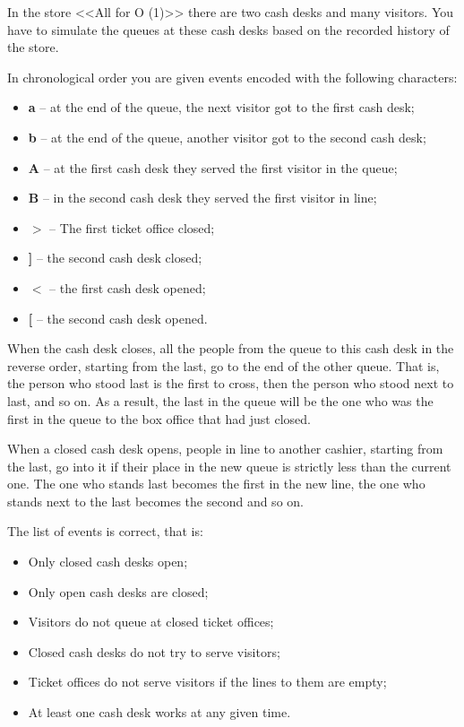 \documentclass[a4paper]{article}
\begin{document}
In the store <<All for O (1)>> there are two cash desks and many visitors. You have to simulate the queues at these cash desks based on the recorded history of the store.

In chronological order you are given events encoded with the following characters:
\begin{itemize}
\item \textbf{a} -- at the end of the queue, the next visitor got to the first cash desk;
\item \textbf{b} -- at the end of the queue, another visitor got to the second cash desk;
\item\textbf{A} -- at the first cash desk they served the first visitor in the queue;
\item \textbf{B} -- in the second cash desk they served the first visitor in line;
\item $\boldsymbol{>}$ -- The first ticket office closed;
\item \textbf{]} -- the second cash desk closed;
\item $\boldsymbol{<}$ -- the first cash desk opened;
\item \textbf{[} -- the second cash desk opened.
\end{itemize}

When the cash desk closes, all the people from the queue to this cash desk in the reverse order, starting from the last, go to the end of the other queue. That is, the person who stood last is the first to cross, then the person who stood next to last, and so on. As a result, the last in the queue will be the one who was the first in the queue to the box office that had just closed.

When a closed cash desk opens, people in line to another cashier, starting from the last, go into it if their place in the new queue is strictly less than the current one. The one who stands last becomes the first in the new line, the one who stands next to the last becomes the second and so on.

The list of events is correct, that is:

\begin{itemize}
\item Only closed cash desks open;
\item Only open cash desks are closed;
\item Visitors do not queue at closed ticket offices;
\item Closed cash desks do not try to serve visitors;
\item Ticket offices do not serve visitors if the lines to them are empty;
\item At least one cash desk works at any given time.
\end{itemize}
\end{document}
